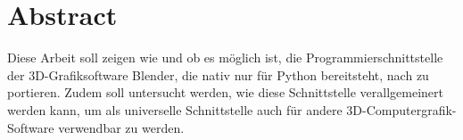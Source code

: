 \section*{Abstract}

Diese Arbeit soll zeigen wie und ob es möglich ist, die Programmierschnittstelle der 3D-Grafiksoftware Blender, die nativ nur für Python bereitsteht, nach \CS zu portieren. Zudem soll untersucht werden, wie diese Schnittstelle verallgemeinert werden kann, um als universelle Schnittstelle auch für andere 3D-Computergrafik-Software verwendbar zu werden.
